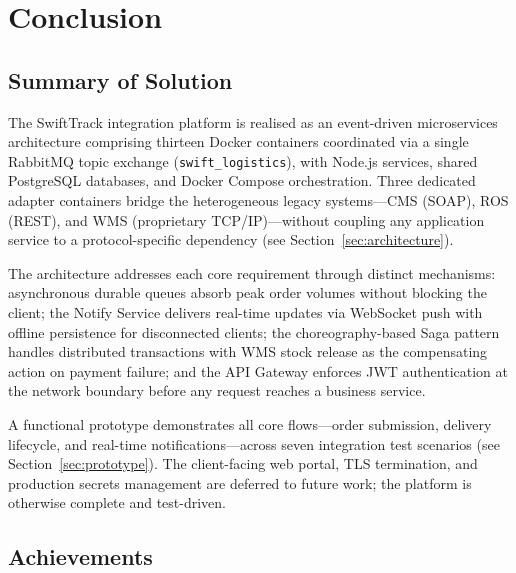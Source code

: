 \section{Conclusion}
\label{sec:conclusion}

\subsection{Summary of Solution}

The SwiftTrack integration platform is realised as an event-driven microservices architecture
comprising thirteen Docker containers coordinated via a single RabbitMQ topic exchange
(\texttt{swift\_logistics}), with Node.js services, shared PostgreSQL databases, and Docker
Compose orchestration. Three dedicated adapter containers bridge the heterogeneous legacy
systems---CMS (SOAP), ROS (REST), and WMS (proprietary TCP/IP)---without coupling any
application service to a protocol-specific dependency (see Section~\ref{sec:architecture}).

The architecture addresses each core requirement through distinct mechanisms:
asynchronous durable queues absorb peak order volumes without blocking the client;
the Notify Service delivers real-time updates via WebSocket push with offline persistence
for disconnected clients; the choreography-based Saga pattern handles distributed
transactions with WMS stock release as the compensating action on payment failure;
and the API Gateway enforces JWT authentication at the network boundary before any
request reaches a business service.

A functional prototype demonstrates all core flows---order submission, delivery lifecycle,
and real-time notifications---across seven integration test scenarios
(see Section~\ref{sec:prototype}). The client-facing web portal, TLS termination,
and production secrets management are deferred to future work;
the platform is otherwise complete and test-driven.

\subsection{Achievements}

